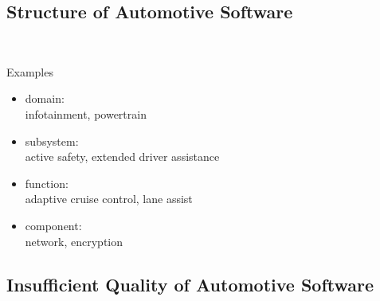 \subsection{Structure of Automotive Software}
\begin{frame}{\insertsubsection\ \mytitlesource{\staron}}
	\begin{fancycolumns}[widths={65}]
		\nextcolumn
		\begin{example}{Examples}
			\begin{itemize}
				\item domain:\\infotainment, powertrain 
				\item subsystem:\\active safety, extended driver assistance
				\item function:\\adaptive cruise control, lane assist
				\item component:\\network, encryption
			\end{itemize}
		\end{example}
	\end{fancycolumns}
\end{frame}


\subsection{Insufficient Quality of Automotive Software}


